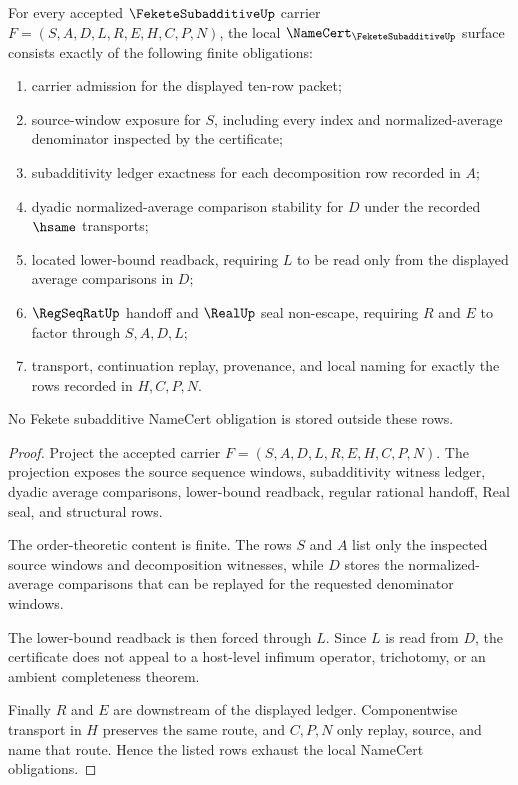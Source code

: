 \begin{theorem}
\label{thm:fekete-subadditive-namecert-obligations}
For every accepted $\FeketeSubadditiveUp$ carrier $F=(S,A,D,L,R,E,H,C,P,N)$, the local $\NameCert_{\FeketeSubadditiveUp}$ surface consists exactly of the following finite obligations:
\begin{enumerate}
\item carrier admission for the displayed ten-row packet;
\item source-window exposure for $S$, including every index and normalized-average denominator inspected by the certificate;
\item subadditivity ledger exactness for each decomposition row recorded in $A$;
\item dyadic normalized-average comparison stability for $D$ under the recorded $\hsame$ transports;
\item located lower-bound readback, requiring $L$ to be read only from the displayed average comparisons in $D$;
\item $\RegSeqRatUp$ handoff and $\RealUp$ seal non-escape, requiring $R$ and $E$ to factor through $S,A,D,L$;
\item transport, continuation replay, provenance, and local naming for exactly the rows recorded in $H,C,P,N$.
\end{enumerate}
No Fekete subadditive NameCert obligation is stored outside these rows.
\end{theorem}
\begin{proof}
Project the accepted carrier $F=(S,A,D,L,R,E,H,C,P,N)$. The projection exposes the source sequence windows, subadditivity witness ledger, dyadic average comparisons, lower-bound readback, regular rational handoff, Real seal, and structural rows.

The order-theoretic content is finite. The rows $S$ and $A$ list only the inspected source windows and decomposition witnesses, while $D$ stores the normalized-average comparisons that can be replayed for the requested denominator windows.

The lower-bound readback is then forced through $L$. Since $L$ is read from $D$, the certificate does not appeal to a host-level infimum operator, trichotomy, or an ambient completeness theorem.

Finally $R$ and $E$ are downstream of the displayed ledger. Componentwise transport in $H$ preserves the same route, and $C,P,N$ only replay, source, and name that route. Hence the listed rows exhaust the local NameCert obligations.
\end{proof}

